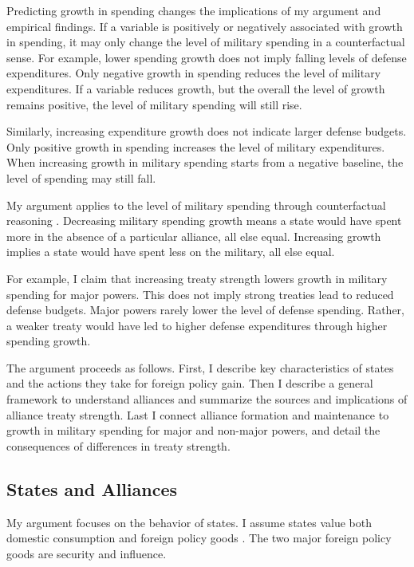 \documentclass[12pt]{article}
\begin{document}
Predicting growth in spending changes the implications of my argument and empirical findings. 
If a variable is positively or negatively associated with growth in spending, it may only change the level of military spending in a counterfactual sense. 
For example, lower spending growth does not imply falling levels of defense expenditures. 
Only negative growth in spending reduces the level of military expenditures. 
If a variable reduces growth, but the overall the level of growth remains positive, the level of military spending will still rise. 


Similarly, increasing expenditure growth does not indicate larger defense budgets. 
Only positive growth in spending increases the level of military expenditures. 
When increasing growth in military spending starts from a negative baseline, the level of spending may still fall. 


My argument applies to the level of military spending through counterfactual reasoning \citep{Fearon1991}. 
Decreasing military spending growth means a state would have spent more in the absence of a particular alliance, all else equal. 
Increasing growth implies a state would have spent less on the military, all else equal.


For example, I claim that increasing treaty strength lowers growth in military spending for major powers. 
This does not imply strong treaties lead to reduced defense budgets. 
Major powers rarely lower the level of defense spending. 
Rather, a weaker treaty would have led to higher defense expenditures through higher spending growth. 


The argument proceeds as follows.
First, I describe key characteristics of states and the actions they take for foreign policy gain. 
Then I describe a general framework to understand alliances and summarize the sources and implications of alliance treaty strength. 
Last I connect alliance formation and maintenance to growth in military spending for major and non-major powers, and detail the consequences of differences in treaty strength.  



\subsection{States and Alliances}


My argument focuses on the behavior of states. 
I assume states value both domestic consumption and foreign policy goods \citep{Powell1993, Fearon2018}. 
The two major foreign policy goods are security and influence. 
\end{document}
